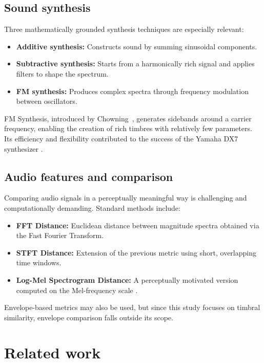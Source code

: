 \documentclass[10pt,conference]{IEEEtran}
\begin{document}
\subsection{Sound synthesis}

Three mathematically grounded synthesis techniques are especially relevant:

\begin{itemize}
    \item \textbf{Additive synthesis:} Constructs sound by summing sinusoidal components.
    \item \textbf{Subtractive synthesis:} Starts from a harmonically rich signal and applies filters to shape the spectrum.
    \item \textbf{FM synthesis:} Produces complex spectra through frequency modulation between oscillators.
\end{itemize}

FM Synthesis, introduced by Chowning~\cite{chowning1973synthesis}, generates sidebands around a carrier frequency, enabling the creation of rich timbres with relatively few parameters. Its efficiency and flexibility contributed to the success of the Yamaha DX7 synthesizer \cite{steinmetz2022ddx7, lazzarini2023higherorder}.

\subsection{Audio features and comparison}

Comparing audio signals in a perceptually meaningful way is challenging and computationally demanding. Standard methods \cite{claesson2021resynthesis} include:

\begin{itemize}
    \item \textbf{FFT Distance:} Euclidean distance between magnitude spectra obtained via the Fast Fourier Transform.
    \item \textbf{STFT Distance:} Extension of the previous metric using short, overlapping time windows.
    \item \textbf{Log-Mel Spectrogram Distance:} A perceptually motivated version computed on the Mel-frequency scale \cite{claesson2021resynthesis,chulev2024improving}.
\end{itemize}

Envelope-based metrics may also be used, but since this study focuses on timbral similarity, envelope comparison falls outside its scope.

\section{Related work} \label{sec:related}
\end{document}
